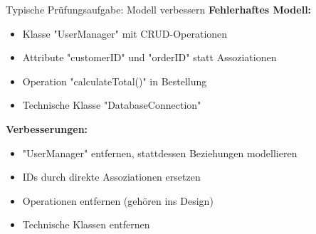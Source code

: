 \begin{example2}{Typische Prüfungsaufgabe: Modell verbessern}
\textbf{Fehlerhaftes Modell:}
\begin{itemize}
    \item Klasse "UserManager" mit CRUD-Operationen
    \item Attribute "customerID" und "orderID" statt Assoziationen
    \item Operation "calculateTotal()" in Bestellung
    \item Technische Klasse "DatabaseConnection"
\end{itemize}

\textbf{Verbesserungen:}
\begin{itemize}
    \item "UserManager" entfernen, stattdessen Beziehungen modellieren
    \item IDs durch direkte Assoziationen ersetzen
    \item Operationen entfernen (gehören ins Design)
    \item Technische Klassen entfernen
\end{itemize}
\end{example2}









